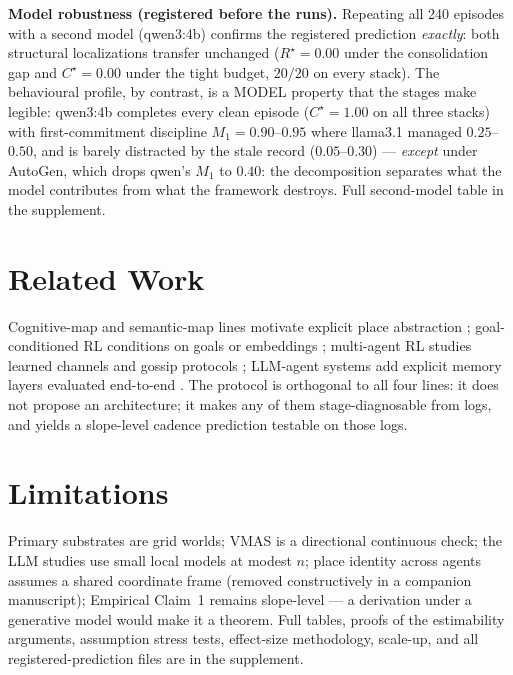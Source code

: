 \documentclass[letterpaper]{article} %
\begin{document}
\textbf{Model robustness (registered before the runs).} Repeating all
240 episodes with a second model (qwen3:4b) confirms the registered
prediction \emph{exactly}: both structural localizations transfer
unchanged ($R^\star{=}0.00$ under the consolidation gap and
$C^\star{=}0.00$ under the tight budget, $20/20$ on every stack). The
behavioural profile, by contrast, is a MODEL property that the stages
make legible: qwen3:4b completes every clean episode
($C^\star{=}1.00$ on all three stacks) with first-commitment
discipline $M_1{=}0.90$--$0.95$ where llama3.1 managed
$0.25$--$0.50$, and is barely distracted by the stale record
($0.05$--$0.30$) --- \emph{except} under AutoGen, which drops qwen's
$M_1$ to $0.40$: the decomposition separates what the model
contributes from what the framework destroys. Full second-model table
in the supplement.

\section{Related Work}

Cognitive-map and semantic-map lines motivate explicit place
abstraction \citep{tolman1948cognitive,gupta2017cognitive,
savinov2018semi}; goal-conditioned RL conditions on goals or
embeddings \citep{andrychowicz2017hindsight}; multi-agent RL studies
learned channels \citep{sukhbaatar2016commnet,foerster2018ctde} and
gossip protocols \citep{boyd2006gossip}; LLM-agent systems add
explicit memory layers evaluated end-to-end
\citep{wang2023voyager,shinn2023reflexion,packer2023memgpt,
park2023generative,wu2023autogen}. The protocol is orthogonal to all
four lines: it does not propose an architecture; it makes any of them
stage-diagnosable from logs, and yields a slope-level cadence
prediction testable on those logs.

\section{Limitations}

Primary substrates are grid worlds; VMAS is a directional continuous
check; the LLM studies use small local models at modest $n$; place
identity across agents assumes a shared coordinate frame (removed
constructively in a companion manuscript); Empirical Claim~1 remains
slope-level --- a derivation under a generative model would make it a
theorem. Full tables, proofs of the estimability arguments,
assumption stress tests, effect-size methodology, scale-up, and all
registered-prediction files are in the supplement.
\end{document}
